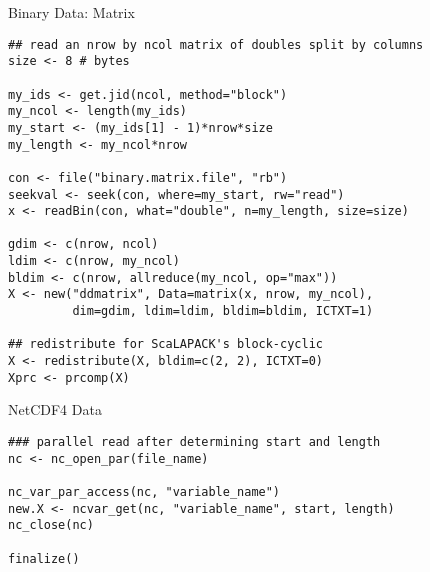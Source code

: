\begin{frame}[fragile]
  \begin{exampleblock}{Binary Data: Matrix}\pause
    \begin{lstlisting}
## read an nrow by ncol matrix of doubles split by columns
size <- 8 # bytes

my_ids <- get.jid(ncol, method="block")
my_ncol <- length(my_ids)
my_start <- (my_ids[1] - 1)*nrow*size
my_length <- my_ncol*nrow

con <- file("binary.matrix.file", "rb")
seekval <- seek(con, where=my_start, rw="read")
x <- readBin(con, what="double", n=my_length, size=size)

gdim <- c(nrow, ncol)
ldim <- c(nrow, my_ncol)
bldim <- c(nrow, allreduce(my_ncol, op="max"))
X <- new("ddmatrix", Data=matrix(x, nrow, my_ncol),
         dim=gdim, ldim=ldim, bldim=bldim, ICTXT=1)

## redistribute for ScaLAPACK's block-cyclic
X <- redistribute(X, bldim=c(2, 2), ICTXT=0)
Xprc <- prcomp(X) 
    \end{lstlisting}
  \end{exampleblock}
\end{frame}

\begin{frame}[fragile]
  \begin{exampleblock}{NetCDF4 Data}\pause
    \begin{lstlisting}
### parallel read after determining start and length
nc <- nc_open_par(file_name)

nc_var_par_access(nc, "variable_name")
new.X <- ncvar_get(nc, "variable_name", start, length)
nc_close(nc)

finalize()
    \end{lstlisting}
  \end{exampleblock}
\end{frame}

